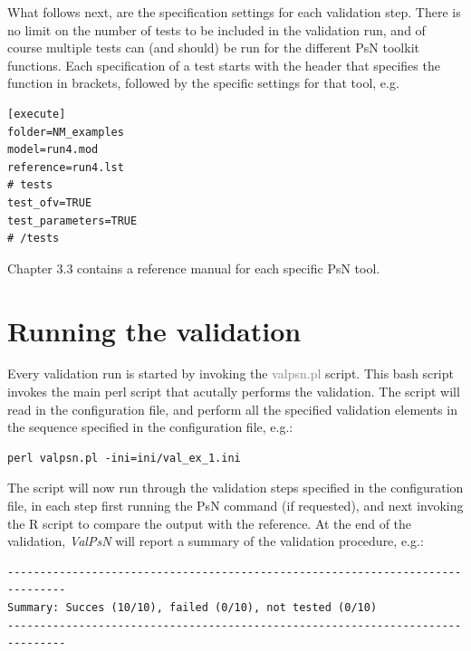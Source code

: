 \documentclass[a4,11pt]{report} \usepackage[pdftex]{graphicx}
\newcommand{\ValPsN}{\textcolor{PiranaOrange}{\textit{ValPsN}}\xspace}
\newcommand{\psn}[1]{\textcolor{Grey}{#1}}
\begin{document}
\vspace{5pt}

\noindent What follows next, are the specification settings for each
validation step. There is no limit on the number of tests to be
included in the validation run, and of course multiple tests can (and
should) be run for the different PsN toolkit functions. Each
specification of a test starts with the header that specifies the function
in brackets, followed by the specific settings for that tool, e.g.

\begin{lstlisting}
[execute]
folder=NM_examples
model=run4.mod
reference=run4.lst
# tests
test_ofv=TRUE
test_parameters=TRUE
# /tests
\end{lstlisting}

\vspace{5pt}

\noindent Chapter 3.3 contains a reference manual for each specific PsN
tool.

\newpage

\section{Running the validation}

Every validation run is started by invoking the \psn{valpsn.pl}
script. This bash script invokes the main perl script that acutally
performs the validation. The script will read in the configuration
file, and perform all the specified validation elements in the
sequence specified in the configuration file, e.g.:

\begin{lstlisting}
perl valpsn.pl -ini=ini/val_ex_1.ini
\end{lstlisting}

\noindent The script will now run through the validation steps specified in the
configuration file, in each step first running the PsN command (if
requested), and next invoking the R script to compare the output with
the reference. At the end of the validation, \ValPsN will report a
summary of the validation procedure, e.g.:

\begin{lstlisting}
-------------------------------------------------------------------------------
Summary: Succes (10/10), failed (0/10), not tested (0/10)
-------------------------------------------------------------------------------
\end{lstlisting}
\end{document}
